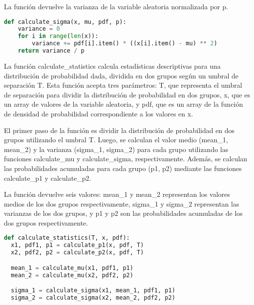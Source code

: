 \documentclass[spanish]{article}
\begin{document}
\begin{enumerate}
\begin{enumerate}
\par La función devuelve la varianza de la variable aleatoria normalizada por p.

\begin{lstlisting}[language=Python, caption=Función de Varianzas]
def calculate_sigma(x, mu, pdf, p):
    variance = 0
    for i in range(len(x)):
        variance += pdf[i].item() * ((x[i].item() - mu) ** 2)
    return variance / p
\end{lstlisting}
\vspace{5px}

\par La función calculate\_statistics calcula estadísticas descriptivas para una distribución de probabilidad dada, dividida en dos grupos según un umbral de separación T. Esta función acepta tres parámetros: T, que representa el umbral de separación para dividir la distribución de probabilidad en dos grupos, x, que es un array de valores de la variable aleatoria, y pdf, que es un array de la función de densidad de probabilidad correspondiente a los valores en x.
\vspace{5px}

\par El primer paso de la función es dividir la distribución de probabilidad en dos grupos utilizando el umbral T. Luego, se calculan el valor medio (mean\_1, mean\_2) y la varianza (sigma\_1, sigma\_2) para cada grupo utilizando las funciones calculate\_mu y calculate\_sigma, respectivamente. Además, se calculan las probabilidades acumuladas para cada grupo (p1, p2) mediante las funciones calculate\_p1 y calculate\_p2.
\vspace{5px}

\par La función devuelve seis valores: mean\_1 y mean\_2 representan los valores medios de los dos grupos respectivamente, sigma\_1 y sigma\_2 representan las varianzas de los dos grupos, y p1 y p2 son las probabilidades acumuladas de los dos grupos respectivamente.
\vspace{5px}

\begin{lstlisting}[language=Python, caption=Función de Momentos Estadisticos]
def calculate_statistics(T, x, pdf):
  x1, pdf1, p1 = calculate_p1(x, pdf, T)
  x2, pdf2, p2 = calculate_p2(x, pdf, T)

  mean_1 = calculate_mu(x1, pdf1, p1)
  mean_2 = calculate_mu(x2, pdf2, p2)

  sigma_1 = calculate_sigma(x1, mean_1, pdf1, p1)
  sigma_2 = calculate_sigma(x2, mean_2, pdf2, p2)


\end{lstlisting}
\end{enumerate}
\end{enumerate}
\end{document}
